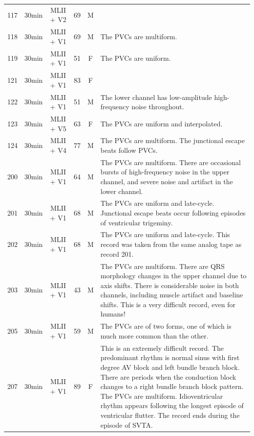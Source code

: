 \documentclass[a4paper,10pt,twoside]{article}
\begin{document}
\begin{table}
\begin{tabular}{c|c|c|c|c|p{14cm}}
 117 & 30min & MLII + V2 & 69 & M & \\
 118 & 30min & MLII + V1 & 69 & M & The PVCs are multiform.\\
 119 & 30min & MLII + V1 & 51 & F & The PVCs are uniform.\\
 121 & 30min & MLII + V1 & 83 & F & \\
 122 & 30min & MLII + V1 & 51 & M & The lower channel has low-amplitude high-frequency noise throughout.\\
 123 & 30min & MLII + V5 & 63 & F & The PVCs are uniform and interpolated.\\
 124 & 30min & MLII + V4 & 77 & M & The PVCs are multiform. The junctional escape beats follow PVCs.\\
 200 & 30min & MLII + V1 & 64 & M & The PVCs are multiform. There are occasional bursts of high-frequency noise in the upper channel, and severe noise and artifact in the lower channel.\\
 201 & 30min & MLII + V1 & 68 & M & The PVCs are uniform and late-cycle. Junctional escape beats occur following episodes of ventricular trigeminy.\\
 202 & 30min & MLII + V1 & 68 & M & The PVCs are uniform and late-cycle. This record was taken from the same analog tape as record 201. \\
 203 & 30min & MLII + V1 & 43 & M & The PVCs are multiform. There are QRS morphology changes in the upper channel due to axis shifts. There is considerable noise in both channels, including muscle artifact and baseline shifts. This is a very difficult record, even for humans! \\
 205 & 30min & MLII + V1 & 59 & M & The PVCs are of two forms, one of which is much more common than the other.\\
 207 & 30min & MLII + V1 & 89 & F & This is an extremely difficult record. The predominant rhythm is normal sinus with first degree AV block and left bundle branch block. There are periods when the conduction block changes to a right bundle branch block pattern. The PVCs are multiform. Idioventricular rhythm appears following the longest episode of ventricular flutter. The record ends during the episode of SVTA.\\
 \hline
 \end{tabular}
\end{table}
\end{document}
